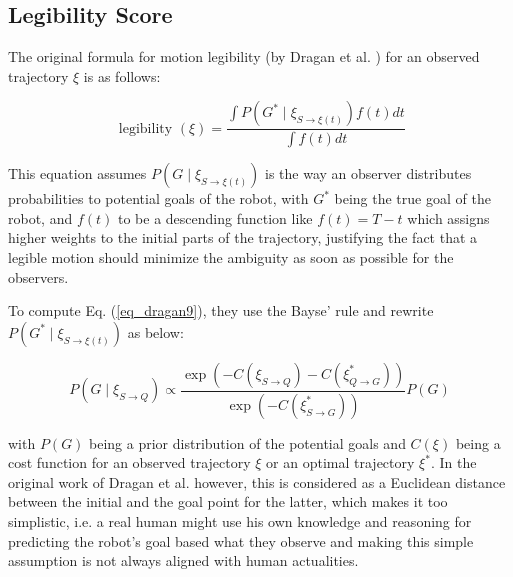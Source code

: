 
\subsection{Legibility Score}

The original formula for motion legibility (by Dragan et al. \cite{dragan2013legibility}) for an observed trajectory $\xi$ \cite{dragan2013legibility} is as follows:

\begin{equation}
    \label{eq_dragan9}
    \text { legibility }(\xi)=\frac{\int P\left(G^* \mid \xi_{S \rightarrow \xi(t)}\right) f(t) d t}{\int f(t) d t}
\end{equation}

\noindent
This equation assumes $P\left(G \mid \xi_{S \rightarrow \xi(t)}\right)$ is the way an observer distributes probabilities to potential goals of the robot, with $G^*$ being the true goal of the robot, and $f(t)$ to be a descending function like $f(t)=T-t$ which assigns higher weights to the initial parts of the trajectory, justifying the fact that a legible motion should minimize the ambiguity as soon as possible for the observers.

To compute Eq. (\ref{eq_dragan9}), they use the Bayse' rule and rewrite $P\left(G^* \mid \xi_{S \rightarrow \xi(t)}\right)$ as below:

\begin{equation}
    \label{eq_dragan8}
    P\left(G \mid \xi_{S \rightarrow Q}\right) \propto \frac{\exp \left(-C\left(\xi_{S \rightarrow Q}\right)-C\left(\xi_{Q \rightarrow G}^*\right)\right)}{\exp \left(-C\left(\xi_{S \rightarrow G}^*\right)\right)} P(G)
\end{equation}

with $P(G)$ being a prior distribution of the potential goals and $C(\xi)$ being a cost function for an observed trajectory $\xi$ or an optimal trajectory $\xi^*$. In the original work of Dragan et al. \cite{dragan2013legibility} however, this is considered as a Euclidean distance between the initial and the goal point for the latter, which makes it too simplistic, i.e. a real human might use his own knowledge and reasoning for predicting the robot's goal based what they observe and making this simple assumption is not always aligned with human actualities.


